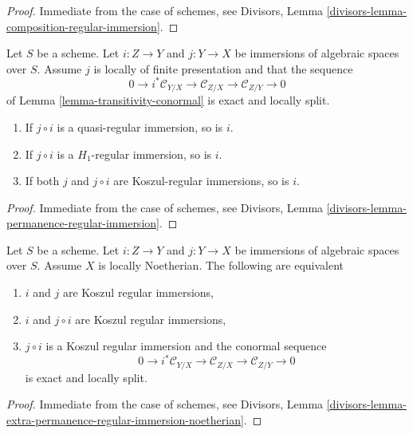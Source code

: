 \begin{proof}
Immediate from the case of schemes, see
Divisors, Lemma \ref{divisors-lemma-composition-regular-immersion}.
\end{proof}

\begin{lemma}
\label{lemma-permanence-regular-immersion}
Let $S$ be a scheme. Let $i : Z \to Y$ and $j : Y \to X$ be immersions of
algebraic spaces over $S$. Assume $j$ is locally of finite presentation
and that the sequence
$$
0 \to i^*\mathcal{C}_{Y/X} \to
\mathcal{C}_{Z/X} \to
\mathcal{C}_{Z/Y} \to 0
$$
of Lemma \ref{lemma-transitivity-conormal} is exact and locally split.
\begin{enumerate}
\item If $j \circ i$ is a quasi-regular immersion, so is $i$.
\item If $j \circ i$ is a $H_1$-regular immersion, so is $i$.
\item If both $j$ and $j \circ i$ are Koszul-regular immersions, so is $i$.
\end{enumerate}
\end{lemma}

\begin{proof}
Immediate from the case of schemes, see
Divisors, Lemma \ref{divisors-lemma-permanence-regular-immersion}.
\end{proof}

\begin{lemma}
\label{lemma-extra-permanence-regular-immersion-noetherian}
Let $S$ be a scheme. Let $i : Z \to Y$ and $j : Y \to X$ be immersions of
algebraic spaces over $S$. Assume $X$ is locally Noetherian.
The following are equivalent
\begin{enumerate}
\item $i$ and $j$ are Koszul regular immersions,
\item $i$ and $j \circ i$ are Koszul regular immersions,
\item $j \circ i$ is a Koszul regular immersion and the conormal sequence
$$
0 \to i^*\mathcal{C}_{Y/X} \to
\mathcal{C}_{Z/X} \to
\mathcal{C}_{Z/Y} \to 0
$$
is exact and locally split.
\end{enumerate}
\end{lemma}

\begin{proof}
Immediate from the case of schemes, see Divisors, Lemma
\ref{divisors-lemma-extra-permanence-regular-immersion-noetherian}.
\end{proof}














